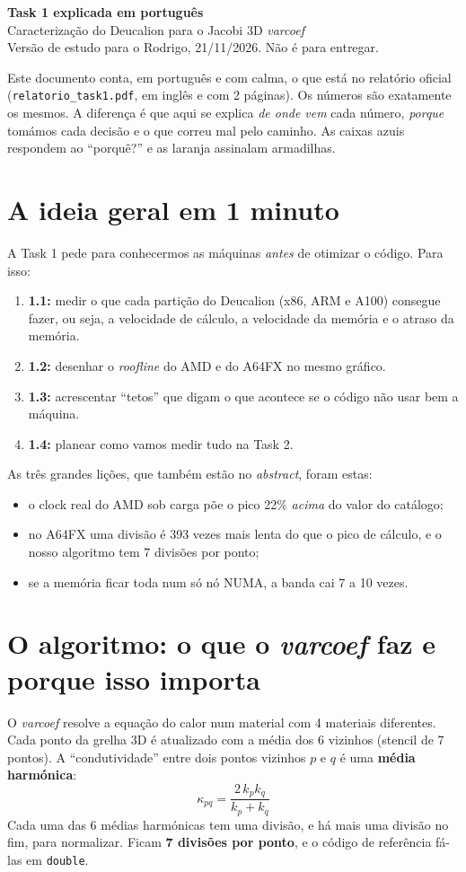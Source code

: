 \documentclass[11pt,a4paper]{article}
\begin{document}
\begin{center}
{\LARGE\bfseries Task 1 explicada em português}\\[4pt]
{\large Caracterização do Deucalion para o Jacobi 3D \emph{varcoef}}\\[4pt]
Versão de estudo para o Rodrigo, 21/11/2026. Não é para entregar.
\end{center}

\noindent Este documento conta, em português e com calma, o que está no relatório oficial
(\texttt{relatorio\_task1.pdf}, em inglês e com 2 páginas). Os números são exatamente os mesmos.
A diferença é que aqui se explica \emph{de onde vem} cada número, \emph{porque} tomámos cada decisão e
o que correu mal pelo caminho. As caixas azuis respondem ao ``porquê?'' e as laranja assinalam
armadilhas.

\tableofcontents

\section{A ideia geral em 1 minuto}
A Task 1 pede para conhecermos as máquinas \emph{antes} de otimizar o código. Para isso:
\begin{enumerate}
\item \textbf{1.1:} medir o que cada partição do Deucalion (x86, ARM e A100) consegue fazer, ou seja, a
velocidade de cálculo, a velocidade da memória e o atraso da memória.
\item \textbf{1.2:} desenhar o \emph{roofline} do AMD e do A64FX no mesmo gráfico.
\item \textbf{1.3:} acrescentar ``tetos'' que digam o que acontece se o código não usar bem a máquina.
\item \textbf{1.4:} planear como vamos medir tudo na Task 2.
\end{enumerate}
As três grandes lições, que também estão no \emph{abstract}, foram estas:
\begin{itemize}
\item o clock real do AMD sob carga põe o pico 22\% \emph{acima} do valor do catálogo;
\item no A64FX uma divisão é 393 vezes mais lenta do que o pico de cálculo, e o nosso algoritmo tem 7 divisões por ponto;
\item se a memória ficar toda num só nó NUMA, a banda cai 7 a 10 vezes.
\end{itemize}

\section{O algoritmo: o que o \emph{varcoef} faz e porque isso importa}
O \emph{varcoef} resolve a equação do calor num material com 4 materiais diferentes. Cada ponto da
grelha 3D é atualizado com a média dos 6 vizinhos (stencil de 7 pontos). A ``condutividade'' entre dois
pontos vizinhos $p$ e $q$ é uma \textbf{média harmónica}:
\[
\kappa_{pq} = \frac{2\,k_p k_q}{k_p + k_q}
\]
Cada uma das 6 médias harmónicas tem uma divisão, e há mais uma divisão no fim, para normalizar.
Ficam \textbf{7 divisões por ponto}, e o código de referência fá-las em \texttt{double}.
\end{document}

